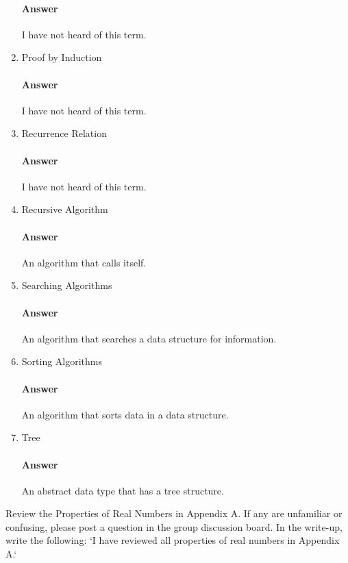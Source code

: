 \documentclass{article}
\begin{document}
\begin{enumerate}
        \paragraph{Answer}
         I have not heard of this term.
    \item Proof by Induction
        \paragraph{Answer}
         I have not heard of this term.
    \item Recurrence Relation
        \paragraph{Answer}
         I have not heard of this term.
    \item Recursive Algorithm
        \paragraph{Answer}
       An algorithm that calls itself.
    \item Searching Algorithms
        \paragraph{Answer}
        An algorithm that searches a data structure for information.
    \item Sorting Algorithms
        \paragraph{Answer}
        An algorithm that sorts data in a data structure.
    \item Tree
        \paragraph{Answer}
        An abstract data type that has a tree structure.
\end{enumerate}

\collab{\todo{}}

Review the Properties of Real Numbers in Appendix A.  If any are unfamiliar or
confusing, please post a question in the group discussion board.  In the
write-up, write the following: `I have reviewed all properties of real numbers
in Appendix A.`
\end{document}
